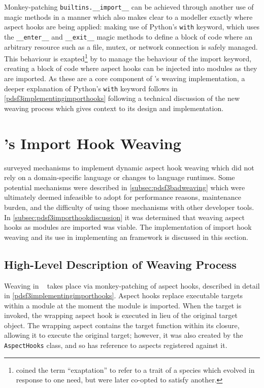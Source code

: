 Monkey-patching \lstinline{builtins.__import__} can be achieved through another
use of magic methods in a manner which also makes clear to a modeller exactly
where aspect hooks are being applied: making use of Python's \lstinline{with}
keyword, which uses the \lstinline{__enter__} and \lstinline{__exit__} magic
methods to define a block of code where an arbitrary resource such as a file,
mutex, or network connection is safely managed. This behaviour is
exapted\footnote{\citet{exaptation_origin} coined the term ``exaptation'' to
refer to a trait of a species which evolved in response to one need, but were
later co-opted to satisfy another.} by \pdsfthree{} to manage the behaviour of the
import keyword, creating a block of code where aspect hooks can be injected into
modules as they are imported. As these are a core component of \pdsfthree{}'s weaving
implementation, a deeper explanation of Python's \lstinline{with} keyword
follows in \cref{pdsf3implementingimporthooks} following a technical discussion
of the new weaving process which gives context to its design and implementation.



\section{\pdsfthree{}'s Import Hook Weaving}\label{sec:import_hooks}

 surveyed mechanisms to implement dynamic aspect hook
weaving which did not rely on a domain-specific language or changes to language
runtimes. Some potential mechanisms were described in
\cref{subsec:pdsf3badweaving} which were ultimately deemed infeasible to adopt
for performance reasons, maintenance burden, and the difficulty of using those
mechanisms with other developer tools. In
\cref{subsec:pdsf3importhookdiscussion} it was determined that weaving aspect
hooks as modules are imported was viable. The implementation of import hook
weaving and its use in implementing an \aop{} framework is discussed in this
section.


\subsection{High-Level Description of Weaving Process}\label{subsec:pdsf3_weaving_process}

Weaving in \pdsfthree{}~\cite{pdsf_source_in_analysis_repo}
takes place via monkey-patching of aspect hooks, described in detail in
\cref{pdsf3implementingimporthooks}. Aspect hooks replace executable targets
within a module at the moment the module is imported. When the target is
invoked, the wrapping aspect hook is executed in lieu of the original target
object. The wrapping aspect contains the target function within its closure,
allowing it to execute the original target; however, it was also created by the
\lstinline{AspectHooks} class, and so has reference to aspects registered
against it. 


